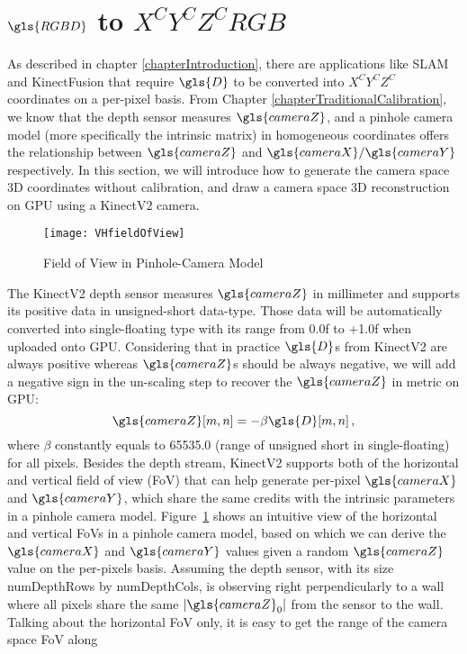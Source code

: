 \section{\(\gls{RGBD}\) to \(X^CY^CZ^CRGB\)}
\label{sectionCameraSpaceReconstruction}
As described in chapter \ref{chapterIntroduction}, there are applications like \gls{SLAM} and KinectFusion that require \(\gls{D}\) to be converted into \(X^CY^CZ^C\) coordinates on a per-pixel basis. From Chapter \ref{chapterTraditionalCalibration}, we know that the depth sensor measures \(\gls{cameraZ}\), and a pinhole camera model (more specifically the intrinsic matrix) in homogeneous coordinates offers the relationship between \(\gls{cameraZ}\) and \(\gls{cameraX}/\gls{cameraY}\) respectively. In this section, we will introduce how to generate the camera space \gls{3D} coordinates without calibration, and draw a camera space \gls{3D} reconstruction on \gls{GPU} using a \gls{KinectV2} camera.
\\\indent
%
\begin{figure}[!b]
\centering
\texttt{[image: VHfieldOfView]}
\caption{Field of View in Pinhole-Camera Model}
\label{VHfieldOfView}
\end{figure}%
%
The \gls{KinectV2} depth sensor measures \(\gls{cameraZ}\) in millimeter and supports its positive data in unsigned-short data-type. Those data will be automatically converted into single-floating type with its range from 0.0f to +1.0f when uploaded onto \gls{GPU}. Considering that in practice \(\gls{D}\)s from \gls{KinectV2} are always positive whereas \(\gls{cameraZ}\)s should be always negative, we will add a negative sign in the un-scaling step to recover the \(\gls{cameraZ}\) in metric on \gls{GPU}:
\begin{equation}
\gls{cameraZ}[m, n] = - \beta \gls{D}[m, n] \, ,
\label{unscalingZc}
\end{equation}%
\noindent
where \(\beta\) constantly equals to 65535.0 (range of unsigned short in single-floating) for all pixels. Besides the depth stream, \gls{KinectV2} supports both of the horizontal and vertical field of view (\gls{FoV}) that can help generate per-pixel \(\gls{cameraX}\) and \(\gls{cameraY}\), which share the same credits with the intrinsic parameters in a pinhole camera model. Figure~\ref{VHfieldOfView} shows an intuitive view of the horizontal and vertical FoVs in a pinhole camera model, based on which we can derive the \(\gls{cameraX}\) and \(\gls{cameraY}\) values given a random \(\gls{cameraZ}\) value on the per-pixels basis. Assuming the depth sensor, with its size numDepthRows by numDepthCols, is observing right perpendicularly to a wall where all pixels share the same \(|\gls{cameraZ}_0|\) from the sensor to the wall. Talking about the horizontal \gls{FoV} only, it is easy to get the range of the camera space \gls{FoV} along 
